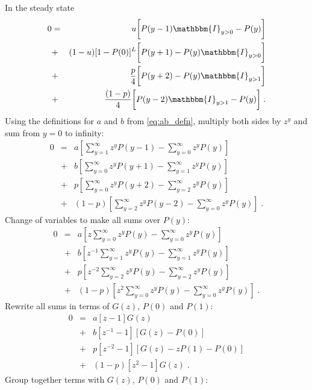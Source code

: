 \documentclass[a4paper,10pt]{article}
\newcommand{\pzero}{P(0)}
\newcommand{\I}{\mathbbm{I}}
\begin{document}
In the steady state
\begin{eqnarray}
  0 & = & u \bigg[ P(y-1) \I_{y>0} - P(y) \bigg] \nonumber \\
				   & + & (1-u)[1-\pzero]^L \bigg[ P(y+1)  - P(y) \I_{y>0} \bigg] \nonumber \\
				   & + & \frac{p}{4} \bigg[ P(y+2) - P(y) \I_{y>1} \bigg] \nonumber \\
				   & + & \frac{(1-p)}{4} \bigg[ P(y-2) \I_{y>1} - P(y) \bigg] \;.
\end{eqnarray}
Using the definitions for $a$ and $b$ from \eqref{eq:ab_defn}, multiply both sides by $z^y$ and sum from $y=0$ to infinity:
\begin{eqnarray}
  0 & = &     a \left[ \sum_{y=1}^\infty z^y P(y-1) - \sum_{y=0}^\infty z^y P(y) \right] \nonumber \\
    & + &     b \left[ \sum_{y=0}^\infty z^y P(y+1) - \sum_{y=1}^\infty z^y P(y) \right] \nonumber \\
    & + &     p \left[ \sum_{y=0}^\infty z^y P(y+2) - \sum_{y=2}^\infty z^y P(y) \right] \nonumber \\
    & + & (1-p) \left[ \sum_{y=2}^\infty z^y P(y-2) - \sum_{y=0}^\infty z^y P(y) \right] \;.
\end{eqnarray}
Change of variables to make all sums over $P(y)$:
\begin{eqnarray}
  0 & = &     a \left[ z     \sum_{y=0}^\infty z^y P(y) - \sum_{y=0}^\infty z^y P(y) \right] \nonumber \\
    & + &     b \left[ z^{-1}\sum_{y=1}^\infty z^y P(y) - \sum_{y=1}^\infty z^y P(y) \right] \nonumber \\
    & + &     p \left[ z^{-2}\sum_{y=2}^\infty z^y P(y) - \sum_{y=2}^\infty z^y P(y) \right] \nonumber \\
    & + & (1-p) \left[ z^2   \sum_{y=0}^\infty z^y P(y) - \sum_{y=0}^\infty z^y P(y) \right] \;.
\end{eqnarray}
Rewrite all sums in terms of $G(z)$, $P(0)$ and $P(1)$:
\begin{eqnarray}
  0 & = &     a \left[ z      - 1 \right] G(z) \nonumber \\
    & + &     b \left[ z^{-1} - 1 \right] \left[ G(z) - P(0) \right] \nonumber \\
    & + &     p \left[ z^{-2} - 1 \right] \left[ G(z) - zP(1) - P(0) \right]\nonumber \\
    & + & (1-p) \left[ z^2    - 1 \right] G(z)\;.
\end{eqnarray}
Group together terms with $G(z)$, $P(0)$ and $P(1)$:
\end{document}
